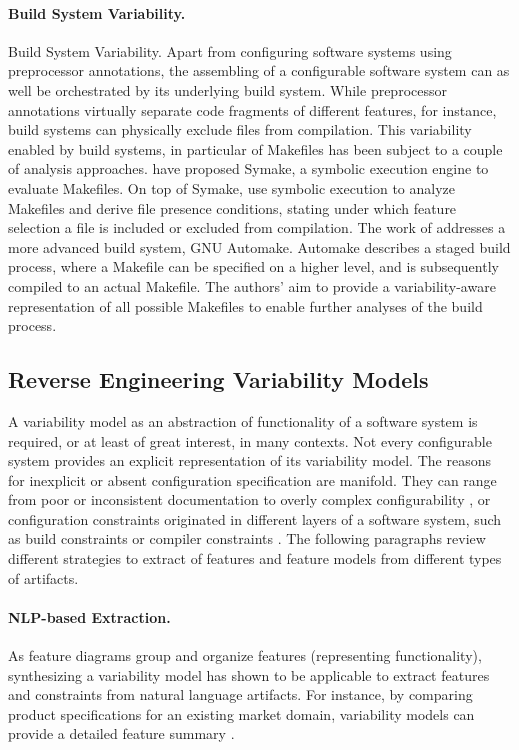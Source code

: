 \paragraph{Build System Variability.} Build System Variability. Apart from
configuring software systems using preprocessor annotations, the assembling of
a configurable software system can as well be orchestrated by its underlying
build system. While preprocessor annotations virtually separate code fragments
of different features, for instance, build systems can physically exclude files
from compilation. This variability enabled by build systems, in particular of
Makefiles has been subject to a couple of analysis approaches. \cite{tamrawi_build_2012} have
proposed Symake, a symbolic execution engine to evaluate Makefiles.
On top of Symake, \cite{zhou_extracting_2015} use symbolic execution to analyze
Makefiles and derive file presence conditions, stating under which feature
selection a file is included or excluded from compilation. The work of
\cite{al-kofahi_escaping_2016} addresses a more advanced build system, GNU Automake.
Automake describes a staged build process, where a Makefile can be specified on
a higher level, and is subsequently compiled to an actual Makefile. The
authors’ aim to provide a variability-aware representation of all possible
Makefiles to enable further analyses of the build process.

\subsection{Reverse Engineering Variability Models} \label{sec:feature_model_synthesis} 
A variability model as an abstraction of functionality of a software system is
required, or at least of great interest, in many contexts. Not every
configurable system provides an explicit representation of its variability
model. The reasons for inexplicit or absent configuration specification are
manifold. They can range from poor or inconsistent documentation \cite{rabkin_static_2011} to
overly complex configurability \cite{xu_hey_2015}, or configuration constraints originated in different layers of a software system,
such as build constraints or compiler constraints \cite{nadi_where_2015}. The
following paragraphs review different strategies to extract of features and
feature models from different types of artifacts.

\paragraph{NLP-based Extraction.} As feature diagrams group and organize
features (representing functionality), synthesizing a variability model has shown to be applicable to extract features
and constraints from natural language artifacts. For instance, by comparing
product specifications for an existing market domain, variability models can
provide a detailed feature summary \citep{alves_exploratory_2008}.

